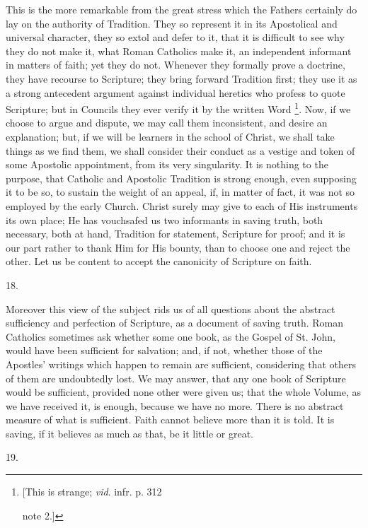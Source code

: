 This is the more remarkable from the great stress which the Fathers
certainly do lay on the authority of Tradition. They so represent it
in its Apostolical and universal character, they so extol and defer to
it, that it is difficult to see why they do not make it, what Roman
Catholics make it, an independent informant in matters of faith; yet
they do not. Whenever they formally prove a doctrine, they have
recourse to Scripture; they bring forward Tradition first; they use it
as a strong antecedent argument against individual heretics who
profess to quote Scripture; but in Councils they ever verify it by the
written Word \footnote{[This is strange; \emph{vid}. infr. p. 312

note 2.]}. Now, if
we choose to argue and dispute, we may call them inconsistent, and
desire an explanation; but, if we will be learners in the school of
Christ, we shall take things as we find them, we shall consider their
conduct as a vestige and token of some Apostolic appointment, from its
very singularity. It is nothing to the purpose, that Catholic and
Apostolic Tradition is strong enough, even supposing it to be so, to
sustain the weight of an appeal, if, in matter of fact, it was not so
employed by the early Church. Christ surely may give to each of
His instruments its own place; He has vouchsafed us two informants in
saving truth, both necessary, both at hand, Tradition for statement,
Scripture for proof; and it is our part rather to thank Him for His
bounty, than to choose one and reject the other. Let us be content to
accept the canonicity of Scripture on faith.

18.

Moreover this view of the subject rids us of all questions about
the abstract sufficiency and perfection of Scripture, as a document of
saving truth. Roman Catholics sometimes ask whether some one book, as
the Gospel of St. John, would have been sufficient for salvation; and,
if not, whether those of the Apostles' writings which happen to remain
are sufficient, considering that others of them are undoubtedly lost.
We may answer, that any one book of Scripture would be sufficient,
provided none other were given us; that the whole Volume, as we have
received it, is enough, because we have no more. There is no abstract
measure of what is sufficient. Faith cannot believe more than it is
told. It is saving, if it believes as much as that, be it little or
great.

19.

